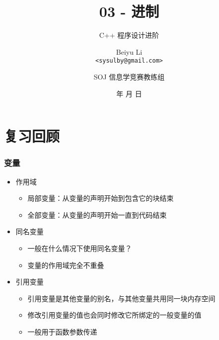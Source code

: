 \title[03 - 进制]
{03 - 进制}

\subtitle{C++ 程序设计进阶}

\author[Beiyu Li]
{Beiyu Li\\
\texttt{<sysulby@gmail.com>}}


\date[\today]
{\number\year 年 \number\month 月 \number\day 日}




\author[sysulby]
{SOJ 信息学竞赛教练组}

\begin{frame}
    \titlepage
\end{frame}
\setcounter{framenumber}{0} %

\section{复习回顾}

\begin{frame}[fragile]
    \frametitle{变量}

    \begin{itemize}
        \item<1-> 作用域
            \begin{itemize}
                \item 局部变量：从变量的声明开始到包含它的块结束
                \item 全部变量：从变量的声明开始一直到代码结束
            \end{itemize}

        \item<2-> 同名变量
            \begin{itemize}
                \item<2-> 一般在什么情况下使用同名变量？
                \item<3-> 变量的作用域完全不重叠
            \end{itemize}

        \item<4-> 引用变量
            \begin{itemize}
                \item 引用变量是其他变量的别名，与其他变量共用同一块内存空间
                \item 修改引用变量的值也会同时修改它所绑定的一般变量的值
                \item 一般用于函数参数传递
            \end{itemize}
    \end{itemize}

\end{frame}

